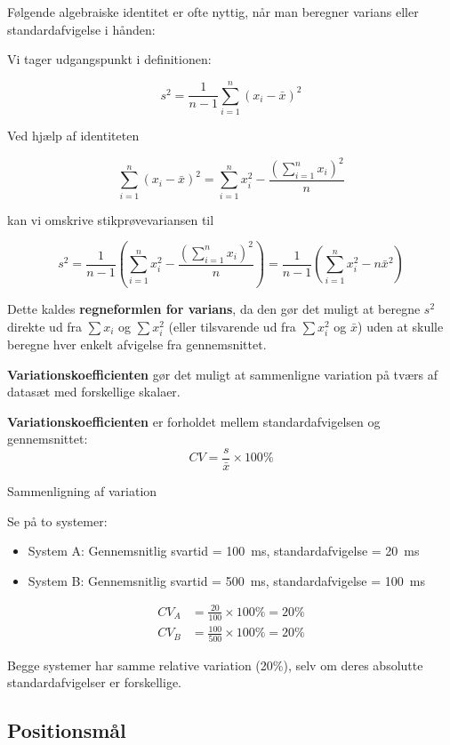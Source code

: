 Følgende algebraiske identitet er ofte nyttig, når man beregner varians eller standardafvigelse i hånden:

Vi tager udgangspunkt i definitionen:

\[
s^2 = \frac{1}{n-1}\sum_{i=1}^n (x_i - \bar{x})^2
\]

Ved hjælp af identiteten

\[
\sum_{i=1}^n (x_i - \bar{x})^2 = \sum_{i=1}^n x_i^2 - \frac{\left(\sum_{i=1}^n x_i \right)^2}{n}
\]

kan vi omskrive stikprøvevariansen til

\[
s^2 = \frac{1}{n-1} \left( \sum_{i=1}^n x_i^2 - \frac{\left(\sum_{i=1}^n x_i\right)^2}{n} \right) =\frac{1}{n-1}\left(\sum_{i=1}^n x_i^2-n \bar{x}^2\right)
\]

Dette kaldes \textbf{regneformlen for varians}, da den gør det muligt at beregne $s^2$ direkte ud fra $\sum x_i$ og $\sum x_i^2$ (eller tilsvarende ud fra $\sum x_i^2$ og $\bar{x}$) uden at skulle beregne hver enkelt afvigelse fra gennemsnittet.


\textbf{Variationskoefficienten} gør det muligt at sammenligne variation på tværs af datasæt med forskellige skalaer.

\begin{definition}[Variationskoefficient]
\textbf{Variationskoefficienten} er forholdet mellem standardafvigelsen og gennemsnittet:
\[
CV = \frac{s}{\bar{x}} \times 100\%
\]
\end{definition}

\begin{example} Sammenligning af variation

Se på to systemer:
\begin{itemize}
    \item System A: Gennemsnitlig svartid = 100~ms, standardafvigelse = 20~ms
    \item System B: Gennemsnitlig svartid = 500~ms, standardafvigelse = 100~ms
\end{itemize}

\begin{align*}
CV_A &= \frac{20}{100} \times 100\% = 20\% \\
CV_B &= \frac{100}{500} \times 100\% = 20\%
\end{align*}

Begge systemer har samme relative variation (20\%), selv om deres absolutte standardafvigelser er forskellige.
\end{example}

\subsection*{Positionsmål}

